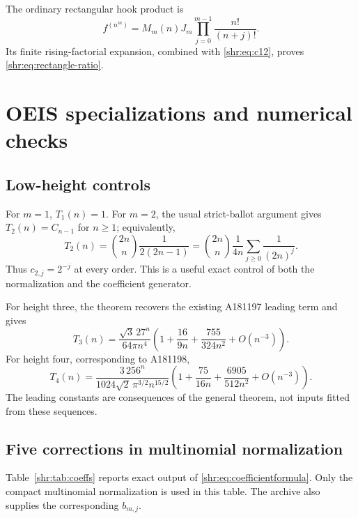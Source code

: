 \documentclass[11pt,letterpaper]{article}
\numberwithin{equation}{section}
\theoremstyle{definition}
\newcommand{\1}{\mathbf 1}
\begin{document}
The ordinary rectangular hook product is
\[
 f^{(n^m)}=M_m(n)J_m\prod_{j=0}^{m-1}\frac{n!}{(n+j)!}.
\]
Its finite rising-factorial expansion, combined with \eqref{shr:eq:c12},
proves \eqref{shr:eq:rectangle-ratio}.

\section{OEIS specializations and numerical checks}

\subsection{Low-height controls}
For $m=1$, $T_1(n)=1$. For $m=2$, the usual strict-ballot argument gives
$T_2(n)=C_{n-1}$ for $n\ge1$; equivalently,
\begin{equation}
 T_2(n)=\binom{2n}{n}\frac1{2(2n-1)}
 =\binom{2n}{n}\frac1{4n}
   \sum_{j\ge0}\frac1{(2n)^j}.
\end{equation}
Thus $c_{2,j}=2^{-j}$ at every order. This is a useful exact control of
both the normalization and the coefficient generator.

For height three, the theorem recovers the existing A181197 leading term
\cite{oeis197} and gives
\begin{equation}
 T_3(n)=\frac{\sqrt3\,27^n}{64\pi n^4}
 \left(1+\frac{16}{9n}+\frac{755}{324n^2}+O(n^{-3})\right).
\end{equation}
For height four, corresponding to A181198,
\begin{equation}
 T_4(n)=\frac{3\,256^n}{1024\sqrt2\,\pi^{3/2}n^{15/2}}
 \left(1+\frac{75}{16n}+\frac{6905}{512n^2}+O(n^{-3})\right).
 \label{shr:eq:A181198exp}
\end{equation}
The leading constants are consequences of the general theorem, not inputs
fitted from these sequences.

\subsection{Five corrections in multinomial normalization}
Table~\ref{shr:tab:coeffs} reports exact output of \eqref{shr:eq:coefficientformula}.
Only the compact multinomial normalization is used in this table.
The archive also supplies the corresponding $b_{m,j}$.
\end{document}
